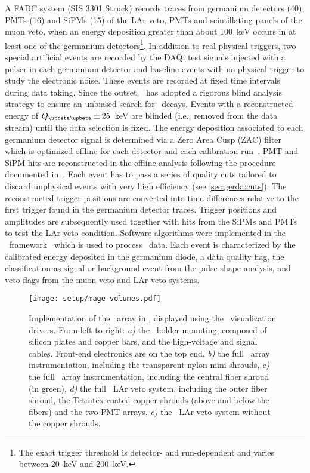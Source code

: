 A FADC system (SIS 3301 Struck) records traces from germanium detectors (40), PMTs (16)
and SiPMs (15) of the LAr veto, PMTs and scintillating panels of the muon veto, when an
energy deposition greater than about 100~keV occurs in at least one of the germanium
detectors\footnote{%
  The exact trigger threshold is detector- and run-dependent and varies between 20~keV and
  200~keV.
}. In addition to real physical triggers, two special artificial events are recorded
by the DAQ: test signals injected with a pulser in each germanium detector and baseline
events with no physical trigger to study the electronic noise. These events are recorded
at fixed time intervals during data taking. Since the outset, \gerda\ has adopted a
rigorous blind analysis strategy to ensure an unbiased search for \onbb\ decays. Events with
a reconstructed energy of $\qbbM \pm 25$~keV are blinded (i.e., removed from
the data stream) until the data selection is fixed.
\newpar
The energy deposition associated to each germanium detector signal is determined via a
Zero Area Cusp (ZAC) filter which is optimized offline for each detector and each
calibration run~\cite{Agostini2015}. PMT and SiPM hits are reconstructed in the offline
analysis following the procedure documented in~\cite{Agostini2018a}. Each event has to
pass a series of quality cuts tailored to discard unphysical events with very high
efficiency (see \cref{sec:gerda:cuts}). The reconstructed trigger positions are converted
into time differences relative to the first trigger found in the germanium detector
traces. Trigger positions and amplitudes are subsequently used together with hits from the
SiPMs and PMTs to test the LAr veto condition. Software algorithms were implemented in the
\gelatio\ framework~\cite{Agostini2011} which is used to process \gerda\ data. Each event
is characterized by the calibrated energy deposited in the germanium diode, a data quality
flag, the classification as signal or background event from the pulse shape analysis, and
veto flags from the muon veto and LAr veto systems.

\begin{figure}
  \centering
  \texttt{[image: setup/mage-volumes.pdf]}
  \caption{%
    Implementation of the \gerda\ array in \mage, displayed using the \geant\
    visualization drivers. From left to right: \emph{a)} the \phasetwo\ holder mounting,
    composed of silicon plates and copper bars, and the high-voltage and signal cables.
    Front-end electronics are on the top end, \emph{b)} the full \phasetwo\ array
    instrumentation, including the transparent nylon mini-shrouds, \emph{c)} the full
    \phasetwop\ array instrumentation, including the central fiber shroud (in green),
    \emph{d)} the full \phasetwo\ LAr veto system, including the outer fiber shroud, the
    Tetratex\reg-coated copper shrouds (above and below the fibers) and the two PMT
    arrays, \emph{e)} the \phasetwop\ LAr veto system without the copper shrouds.
  }\label{fig:setup:magevolumes}
\end{figure}

